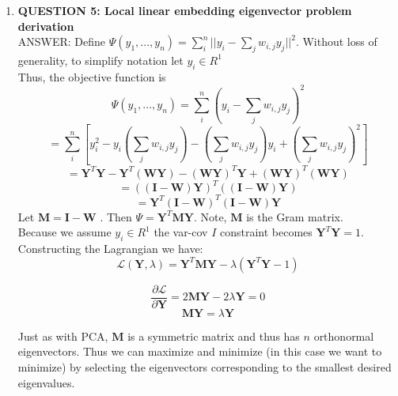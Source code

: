 \documentclass[a4paper, 12pt]{article}
\begin{document}
\begin{enumerate}
\begin{enumerate}
	\end{enumerate}

	\item \textbf{QUESTION 5: Local linear embedding eigenvector problem derivation } 
	\\
	ANSWER: Define $\Psi (y_1, ... , y_n) = \sum_i^n ||y_i - \sum_j w_{i,j} y_j ||^2 $. Without loss of generality, to simplify notation let $y_i \in R^1$
	\\Thus, the objective function is 
	$$\Psi (y_1, ... , y_n) = \sum_i^n (y_i - \sum_j w_{i,j} y_j )^2 $$
	$$ = \sum_i^n [y_i^2 - y_i(\sum_j w_{i,j} y_j) - (\sum_j w_{i,j} y_j)y_i + (\sum_j w_{i,j} y_j)^2             ] $$
	$$ = \textbf{Y}^T\textbf{Y} - \textbf{Y}^T(\textbf{WY}) - (\textbf{WY})^T\textbf{Y}  +  (\textbf{WY})^T(\textbf{WY})$$
	$$ = ((\textbf{I} - \textbf{W})  \textbf{Y}    )^T   ((\textbf{I} - \textbf{W})  \textbf{Y}    )$$
	$$ = \textbf{Y}^T(\textbf{I} - \textbf{W})^T    (\textbf{I} - \textbf{W})\textbf{Y}   $$
	Let $\textbf{M} = \textbf{I} - \textbf{W} $ . Then $\Psi = \textbf{Y}^T\textbf{M}\textbf{Y}$. Note, $\textbf{M}$ is the Gram matrix.
	\\ Because we assume $y_i \in R^1$ the var-cov $I$ constraint becomes $\textbf{Y}^T\textbf{Y} = 1$. Constructing the Lagrangian we have:
	$$ \mathscr{L}(\textbf{Y}, \lambda) =  \textbf{Y}^T\textbf{M}\textbf{Y}  - \lambda(\textbf{Y}^T\textbf{Y} - 1)$$
	
	$$ \frac{\partial \mathscr{L} }{\partial \textbf{Y}} = 2 \textbf{MY} - 2\lambda \textbf{Y} = 0  $$
	$$ \textbf{MY} = \lambda \textbf{Y}$$

	Just as with PCA, $\textbf{M}$ is a symmetric matrix and thus has $n$ orthonormal eigenvectors. Thus we can maximize and minimize (in this case we want to minimize) by selecting the eigenvectors corresponding to the smallest desired eigenvalues. 

\end{enumerate}
\end{document}
